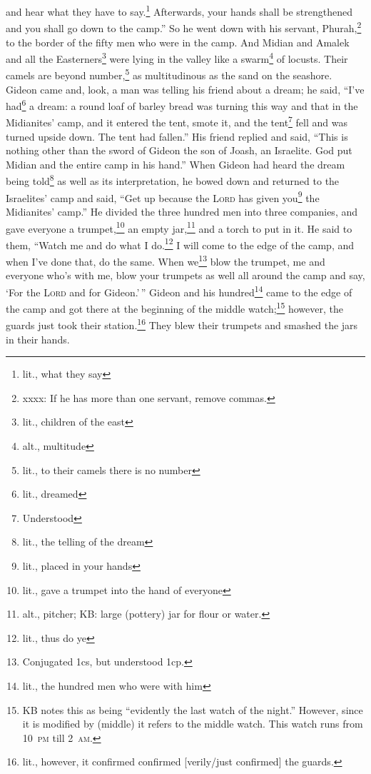 \begin{inparaenum}
     and hear what they have to say.\footnote{lit., what they say} Afterwards, your hands shall be strengthened and you shall go down to the camp.'' So he went down with his servant, Phurah,\footnote{xxxx: If he has more than one servant, remove commas.} to the border of the fifty men who were in the camp.%
     And Midian and Amalek and all the Easterners\footnote{lit., children of the east} were lying in the valley like a swarm\footnote{alt., multitude} of locusts. Their camels are beyond number,\footnote{lit., to their camels there is no number} as multitudinous as the sand on the seashore.%
     Gideon came and, look, a man was telling his friend about a dream; he said, ``I've had\footnote{lit., dreamed} a dream: a round loaf of barley bread was turning this way and that in the Midianites' camp, and it entered the tent, smote it, and the tent\footnote{Understood} fell and was turned upside down. The tent had fallen.''%
     His friend replied and said, ``This is nothing other than the sword of Gideon the son of Joash, an Israelite. God put Midian and the entire camp in his hand.''%
     When Gideon had heard the dream being told\footnote{lit., the telling of the dream} as well as its interpretation, he bowed down and returned to the Israelites' camp and said, ``Get up because the \textsc{Lord} has given you\footnote{lit., placed in your hands} the Midianites' camp.''%
     He divided the three hundred men into three companies, and gave everyone a trumpet,\footnote{lit., gave a trumpet into the hand of everyone} an empty jar,\footnote{alt., pitcher; KB: large (pottery) jar for flour or water.} and a torch to put in it.%
     He said to them, ``Watch me and do what I do.\footnote{lit., thus do ye} I will come to the edge of the camp, and when I've done that, do the same.%
     When we\footnote{Conjugated 1cs, but understood 1cp.} blow the trumpet, me and everyone who's with me, blow your trumpets as well all around the camp and say, `For the \textsc{Lord} and for Gideon.'\,''%
     Gideon and his hundred\footnote{lit., the hundred men who were with him} came to the edge of the camp and got there at the beginning of the middle watch;\footnote{KB notes this as being ``evidently the last watch of the night.'' However, since it is modified by  (middle) it refers to the middle watch. This watch runs from 10~\textsc{pm} till 2~\textsc{am}.} however, the guards just took their station.\footnote{lit., however, it confirmed confirmed [verily/just confirmed] the guards.} They blew their trumpets and smashed the jars in their hands.%

\end{inparaenum}
